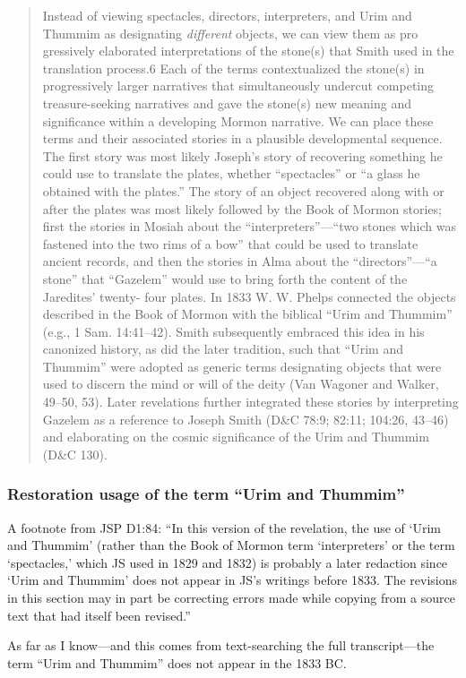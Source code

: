 		\begin{quote}
			Instead of viewing spectacles, directors, interpreters, and Urim and Thummim as designating \textit{different} objects, we can view them as pro gressively elaborated interpretations of the stone(s) that Smith used in the translation process.6 Each of the terms contextualized the stone(s) in progressively larger narratives that simultaneously undercut competing treasure-seeking narratives and gave the stone(s) new meaning and significance within a developing Mormon narrative. We can place these terms and their associated stories in a plausible developmental sequence. The first story was most likely Joseph's story of recovering something he could use to translate the plates, whether ``spectacles'' or ``a glass he obtained with the plates.'' The story of an object recovered along with or after the plates was most likely followed by the Book of Mormon stories; first the stories in Mosiah about the ``interpreters''---``two stones which was fastened into the two rims of a bow'' that could be used to translate ancient records, and then the stories in Alma about the ``directors''---``a stone'' that ``Gazelem'' would use to bring forth the content of the Jaredites' twenty- four plates. In 1833 W. W. Phelps connected the objects described in the Book of Mormon with the biblical ``Urim and Thummim'' (e.g., 1 Sam. 14:41--42). Smith subsequently embraced this idea in his canonized history, as did the later tradition, such that ``Urim and Thummim'' were adopted as generic terms designating objects that were used to discern the mind or will of the deity (Van Wagoner and Walker, 49--50, 53). Later revelations further integrated these stories by interpreting Gazelem as a reference to Joseph Smith (D\&C 78:9; 82:11; 104:26, 43--46) and elaborating on the cosmic significance of the Urim and Thummim (D\&C 130).
		\end{quote}
		
	\subsubsection{Restoration usage of the term ``Urim and Thummim''}
		\label{URIMTHUMMIM-restoration}
		
		\begin{compactitem}
			\item A footnote from JSP D1:84: ``In this version of the revelation, the use of `Urim and Thummim' (rather than the Book of Mormon term `interpreters' or the term `spectacles,' which JS used in 1829 and 1832) is probably a later redaction since `Urim and Thummim' does not appear in JS's writings before 1833. The revisions in this section may in part be correcting errors made while copying from a source text that had itself been revised.''
			\item As far as I know---and this comes from text-searching the full transcript---the term ``Urim and Thummim'' does not appear in the 1833 BC.
		\end{compactitem}